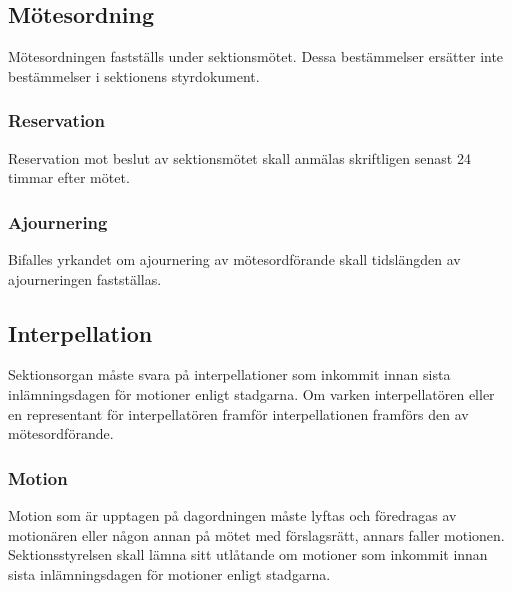 \subsection{Mötesordning}
Mötesordningen fastställs under sektionsmötet. Dessa bestämmelser ersätter inte bestämmelser i sektionens styrdokument.

\subsubsection{Reservation}
Reservation mot beslut av sektionsmötet skall anmälas skriftligen senast 24 timmar efter mötet.

\subsubsection{Ajournering}
Bifalles yrkandet om ajournering av mötesordförande skall tidslängden av ajourneringen fastställas.

\subsection{Interpellation}
Sektionsorgan måste svara på interpellationer som inkommit innan sista inlämningsdagen för motioner enligt stadgarna. Om varken interpellatören eller en representant för interpellatören framför interpellationen framförs den av mötesordförande.

\subsubsection{Motion}
Motion som är upptagen på dagordningen måste lyftas och föredragas av motionären eller någon annan på mötet med förslagsrätt, annars faller motionen. Sektionsstyrelsen skall lämna sitt utlåtande om motioner som inkommit innan sista inlämningsdagen för motioner enligt stadgarna.
